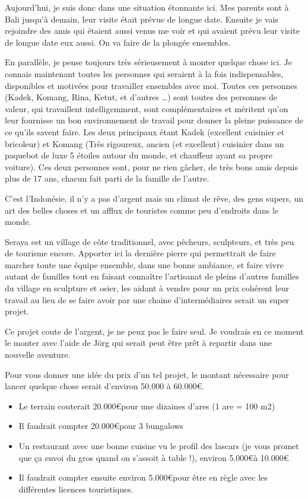 Aujourd’hui, je suis donc dans une situation étonnante ici. Mes parents sont à Bali jusqu’à demain, leur visite était prévue de longue date. Ensuite je vais rejoindre des amis qui étaient aussi venus me voir et qui avaient prévu leur visite de longue date eux aussi. On va faire de la plongée ensembles.

En parallèle, je pense toujours très sérieusement à monter quelque chose ici. Je connais maintenant toutes les personnes qui seraient à la fois indispensables, disponibles et motivées pour travailler ensembles avec moi. Toutes ces personnes (Kadek, Komang, Rina, Ketut, et d’autres …) sont toutes des personnes de valeur, qui travaillent intelligemment, sont complémentaires et méritent qu’on leur fournisse un bon environnement de travail pour donner la pleine puissance de ce qu’ils savent faire. Les deux principaux étant Kadek (excellent cuisinier et bricoleur) et Komang (Très rigoureux, ancien (et excellent) cuisinier dans un paquebot de luxe 5 étoiles autour du monde, et chauffeur ayant sa propre voiture). Ces deux personnes sont, pour ne rien gâcher, de très bons amis depuis plus de 17 ans, chacun fait parti de la famille de l’autre.

C’est l’Indonésie, il n’y a pas d’argent mais un climat de rêve, des gens supers, un art des belles choses et un afflux de touristes comme peu d’endroits dans le monde.

Seraya est un village de côte traditionnel, avec pêcheurs, sculpteurs, et très peu de tourisme encore. Apporter ici la dernière pierre qui permettrait de faire marcher toute une équipe ensemble, dans une bonne ambiance, et faire vivre autant de familles tout en faisant connaître l’artisanat de pleins d’autres familles du village en sculpture et osier, les aidant à vendre pour un prix cohérent leur travail au lieu de se faire avoir par une chaine d’intermédiaires serait un super projet.

Ce projet coute de l’argent, je ne peux pas le faire seul. Je voudrais en ce moment le monter avec l’aide de Jörg qui serait peut être prêt à repartir dans une nouvelle aventure.

Pour vous donner une idée du prix d’un tel projet, le montant nécessaire pour lancer quelque chose serait d’environ 50.000 à 60.000\euro .

\begin{itemize}
     \item Le terrain couterait 20.000\euro  pour une dizaines d’ares (1 are = 100 m2)
     \item Il faudrait compter 20.000\euro  pour 3 bungalows
     \item Un restaurant avec une bonne cuisine vu le profil des lascars (je vous promet que ça envoi du gros quand on s’assoit à table !), environ 5.000\euro  à 10.000\euro
     \item Il faudrait compter ensuite environ 5.000\euro  pour être en règle avec les différentes licences touristiques.
\end{itemize}

